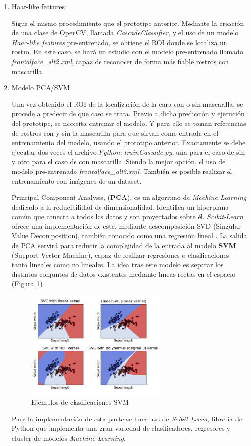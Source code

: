 \begin{enumerate}
	\item Haar-like features
	
	Sigue el mismo procedimiento que el prototipo anterior. Mediante la creación de una clase de OpenCV, llamada \textit{CascadeClassifier}, y el uso de un modelo \textit{Haar-like features} pre-entrenado, se obtiene el ROI donde se localiza un rostro. En este caso, se hará un estudio con el modelo pre-entrenado llamado \textit{frontalface\_alt2.xml}, capaz de reconocer de forma más fiable rostros con mascarilla. 
	
	\item Modelo PCA/SVM
	
	Una vez obtenido el ROI de la localización de la cara con o sin mascarilla, se procede a predecir de que caso se trata. Previo a dicha predicción y ejecución del prototipo, se necesita entrenar el modelo. Y para ello se toman referencias de rostros con y sin la mascarilla para que sirvan como entrada en el entrenamiento del modelo, usando el prototipo anterior. Exactamente se debe ejecutar dos veces el archivo \textit{Python: trainCascade.py}, una para el caso de sin y otro para el caso de con mascarilla. Siendo la mejor opción, el uso del modelo pre-entrenado \textit{frontalface\_alt2.xml}. También es posible realizar el entrenamiento con imágenes de un dataset.
	
	Principal Component Analysis, (\textbf{PCA}), es un algoritmo de \textit{Machine Learning} dedicado a la reducibilidad de dimensionalidad. Identifica un hiperplano común que conecta a todos los datos y son proyectados sobre él. \textit{Scikit-Learn} ofrece una implementación de este, mediante descomposición SVD (Singular Value Decomposition), también conocido como una regresión lineal \cite{geron_2020}. La salida de PCA servirá para reducir la complejidad de la entrada al modelo \textbf{SVM} (Support Vector Machine), capaz de realizar regresiones o clasificaciones tanto lineales como no lineales. La idea tras este modelo es separar los distintos conjuntos de datos existentes mediante lineas rectas en el espacio (Figura \ref{fig:svm}) \cite{geron_2020}.
	
	\begin{figure}[htp]
		\centering
		\includegraphics[width=7cm]{imagenes/svm_example.png}
		\caption{Ejemplos de clasificaciones SVM}
		\label{fig:svm}
	\end{figure}

	Para la implementación de esta parte se hace uso de \textit{Scikit-Learn}, librería de Python que implementa una gran variedad de clasificadores, regresores y cluster de modelos \textit{Machine Learning}.
\end{enumerate}

